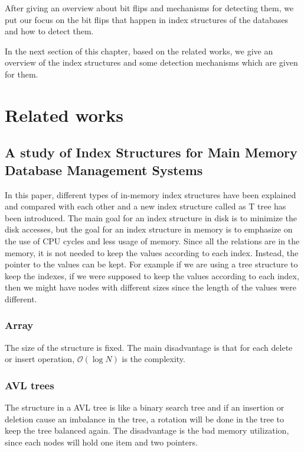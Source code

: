 \documentclass[12pt]{report}
\begin{document}
After giving an overview about bit flips and mechanisms for detecting them, we put our focus on the bit flips that happen in index structures of the databases and how to detect them.
 
In the next section of this chapter, based on the related works, we give an overview of the index structures and some detection mechanisms which are given for them. 

\section{Related works}

\subsection{A study of Index Structures for Main Memory Database Management Systems  \cite{leca} }

In this paper, different types of in-memory index structures have been explained and compared with each other and a new index structure called as T tree has been introduced.
The main goal for an index structure in disk is to minimize the disk accesses, but the goal for an index structure in memory is to emphasize on the use of CPU cycles and less usage of memory. Since all the relations are in the memory, it is not needed to keep the values according to each index. Instead, the pointer to the values can be kept. For example if we are using a tree structure to keep the indexes, if we were supposed to keep the values according to each index, then we might have nodes with different sizes since the length of the values were different.
\subsubsection{Array}

The size of the structure is fixed. The main disadvantage is that for each delete or insert operation, $\mathcal{O}(\log{}N)$ is the complexity.

\subsubsection{AVL trees}

The structure in a AVL tree is like a binary search tree and if an insertion or deletion cause an imbalance in the tree, a rotation will be done in the tree to keep the tree balanced again. The disadvantage is the bad memory utilization, since each nodes will hold one item and two pointers.
 
\end{document}
